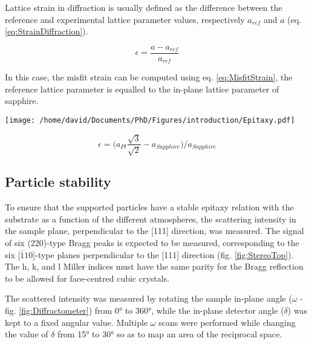 Lattice strain in diffraction is usually defined as the difference between the reference and experimental lattice parameter values, respectively $a_{ref}$ and $a$ (eq. \ref{eq:StrainDiffraction}).

\begin{equation}
    \epsilon = \frac{a - a_{ref}}{a_{ref}}
    \label{eq:StrainDiffraction}
\end{equation}

In this case, the misfit strain can be computed using eq. \ref{eq:MisfitStrain}, the reference lattice parameter is equalled to the in-plane lattice parameter of sapphire.

\begin{minipage}{0.55\linewidth}
    \centering
    \texttt{[image: /home/david/Documents/PhD/Figures/introduction/Epitaxy.pdf]}
    \label{fig:Epitaxy}
\end{minipage}%
\hfill%
\begin{minipage}{0.44\linewidth}
    \begin{equation}
        \epsilon = \big( a_{Pt} \frac{\sqrt{3}}{\sqrt{2}} - a_{Sapphire} \big) / a_{Sapphire}
        \label{eq:MisfitStrain}
    \end{equation}
\end{minipage}%

\subsection{Particle stability}

To ensure that the  supported particles have a stable epitaxy relation with the substrate as a function of the different atmospheres, the scattering intensity in the sample plane, perpendicular to the [111] direction, was measured.
The signal of six (220)-type Bragg peaks is expected to be measured, corresponding to the six [$\bar{1}10$]-type planes perpendicular to the [111] direction (fig. \ref{fig:StereoTop}).
The h, k, and l Miller indices must have the same parity for the Bragg reflection to be allowed for face-centred cubic crystals.

The scattered intensity was measured by rotating the sample in-plane angle ($\omega$ - fig. \ref{fig:Diffractometer}) from \ang{0} to \ang{360}, while the in-plane detector angle ($\delta$) was kept to a fixed angular value.
Multiple $\omega$ scans were performed while changing the value of $\delta$ from \ang{15} to \ang{30} so as to map an area of the reciprocal space.


